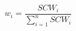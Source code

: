 \begin{equation}
    w_{i} = \frac{SCW_{i}}{\sum^{n}_{i=1} SCW_{i}} 
\label{eq:p3}
\end{equation}







